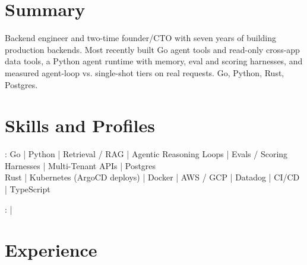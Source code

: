 \documentclass[print]{jack-resume}
\begin{document}
\pagecolor{darkmodeBackground}


\begin{minipage}[t][1cm][t]{.03\textwidth}
    \hfill
\end{minipage}

\section{Summary}
Backend engineer and two-time founder/CTO with seven years of building production backends. Most recently built Go agent tools and read-only cross-app data tools, a Python agent runtime with memory, eval and scoring harnesses, and measured agent-loop vs. single-shot tiers on real requests. Go, Python, Rust, Postgres.
\sectionsep

\section{Skills and Profiles}
:
Go \hfill | \hfill
Python \hfill | \hfill
Retrieval / RAG \hfill | \hfill
Agentic Reasoning Loops \hfill | \hfill
Evals / Scoring Harnesses \hfill | \hfill
Multi-Tenant APIs \hfill | \hfill
Postgres \\
\hspace{1.0cm} Rust \hfill | \hfill
Kubernetes (ArgoCD deploys) \hfill | \hfill
Docker \hfill | \hfill
AWS / GCP \hfill | \hfill
Datadog \hfill | \hfill
CI/CD \hfill | \hfill
TypeScript \\

\raggedright{
    :
      \href{https://www.linkedin.com/in/jack-sturtevant/}{ \ExternalLink} |
     \href{https://github.com/jacksturt}{ \ExternalLink}}

\section{Experience}
\end{document}
